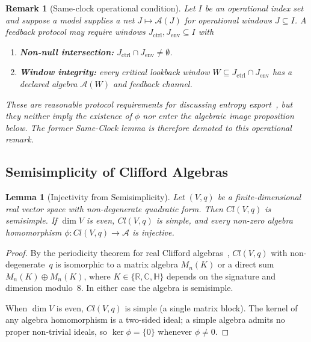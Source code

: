 \documentclass[12pt]{article}
\newtheorem{lemma}[theorem]{Lemma}
\newtheorem{remark}[theorem]{Remark}
\begin{document}
\begin{remark}[Same-clock operational condition]
Let $I$ be an operational index set and suppose a model supplies a net $J\mapsto\mathcal A(J)$ for operational windows $J\subseteq I$.  A feedback protocol may require windows $J_{\mathrm{ctrl}},J_{\mathrm{env}}\subseteq I$ with
\begin{enumerate}
    \item \textbf{Non-null intersection:} $J_{\mathrm{ctrl}}\cap J_{\mathrm{env}}\neq\emptyset$.
    \item \textbf{Window integrity:} every critical lookback window $W\subseteq J_{\mathrm{ctrl}}\cap J_{\mathrm{env}}$ has a declared algebra $\mathcal A(W)$ and feedback channel.
\end{enumerate}
These are reasonable protocol requirements for discussing entropy export~\cite{Seifert2012}, but they neither imply the existence of $\phi$ nor enter the algebraic image proposition below.  The former Same-Clock lemma is therefore demoted to this operational remark.
\end{remark}

\subsection{Semisimplicity of Clifford Algebras}

\begin{lemma}[Injectivity from Semisimplicity]
\label{lem:semisimple}
Let $(V,q)$ be a finite-dimensional real vector space with
non-degenerate quadratic form.
Then $Cl(V,q)$ is semisimple.
If\/ $\dim V$ is even, $Cl(V,q)$ is simple, and every
non-zero algebra homomorphism
$\phi: Cl(V,q) \to \mathcal{A}$ is injective.
\end{lemma}

\begin{proof}
By the periodicity theorem for real Clifford
algebras~\cite{ABS1964,LawsonMichelsohn1989}, $Cl(V,q)$
with non-degenerate~$q$ is isomorphic to a matrix algebra
$M_n(K)$ or a direct sum $M_n(K) \oplus M_n(K)$,
where $K \in \{\mathbb{R}, \mathbb{C}, \mathbb{H}\}$
depends on the signature and dimension modulo~$8$.
In either case the algebra is semisimple.

When $\dim V$ is even, $Cl(V,q)$ is simple (a single matrix
block).
The kernel of any algebra homomorphism is a two-sided ideal;
a simple algebra admits no proper non-trivial ideals,
so $\ker\phi = \{0\}$ whenever $\phi \neq 0$.
\end{proof}
\end{document}
